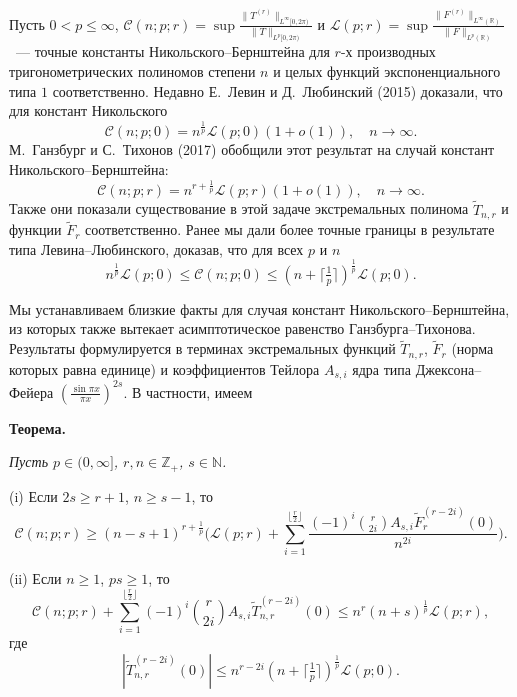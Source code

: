 \vzmscaption

Пусть $0<p\le \infty$, $\mathcal{C}(n;p;r)=\sup
\frac{\|T^{(r)}\|_{L^{\infty}[0,2\pi)}}{\|T\|_{L^{p}[0,2\pi)}}$ и
$\mathcal{L}(p;r)=\sup
\frac{\|F^{(r)}\|_{L^{\infty}(\mathbb{R})}}{\|F\|_{L^{p}(\mathbb{R})}}$~---
точные константы Никольского--Бернштейна для $r$-х производных
тригонометрических полиномов степени $n$ и целых функций экспоненциального типа
$1$ соответственно. Недавно Е.~Левин и Д.~Любинский (2015) доказали, что для
констант Никольского
\[
\mathcal{C}(n;p;0)=n^{\frac{1}{p}}\mathcal{L}(p;0)(1+o(1)),\quad n\to \infty.
\]
М.~Ганзбург и С.~Тихонов (2017) обобщили этот результат на случай констант
Никольского--Бернштейна:
\[
\mathcal{C}(n;p;r)=n^{r+\frac{1}{p}}\mathcal{L}(p;r)(1+o(1)),\quad n\to \infty.
\]
Также они показали существование в этой задаче экстремальных полинома
$\tilde{T}_{n,r}$ и функции $\tilde{F}_{r}$ соответственно. Ранее мы дали более
точные границы в результате типа Левина--Любинского, доказав, что для всех $p$
и $n$
\[
n^{\frac{1}{p}}\mathcal{L}(p;0)\le \mathcal{C}(n;p;0)\le (n+\lceil
\tfrac{1}{p}\rceil)^{\frac{1}{p}}\mathcal{L}(p;0).
\]

Мы устанавливаем близкие факты для случая констант Никольского--Бернштейна, из
которых также вытекает асимптотическое равенство Ганзбурга--Тихонова.
Результаты формулируется в терминах экстремальных функций $\tilde{T}_{n,r}$,
$\tilde{F}_{r}$ (норма которых равна единице) и коэффициентов Тейлора $A_{s,i}$
ядра типа Джексона--Фейера $(\frac{\sin \pi x}{\pi x})^{2s}$. В частности,
имеем

\textbf{Теорема.} {\it Пусть $p\in (0,\infty]$, $r,n\in \mathbb{Z}_{+}$, $s\in
\mathbb{N}$.

\textup{(i)} Если $2s\ge r+1$, $n\ge s-1$, то
\[
\mathcal{C}(n;p;r)\ge (n-s+1)^{r+\frac{1}{p}}\biggl(\mathcal{L}(p;r)+
\sum_{i=1}^{\lfloor
\frac{r}{2}\rfloor}\frac{(-1)^{i}\binom{r}{2i}A_{s,i}\tilde{F}_{r}^{(r-2i)}(0)}{n^{2i}}\biggr).
\]

\textup{(ii)} Если $n\ge 1$, $ps\ge 1$, то
\[
\mathcal{C}(n;p;r)+\sum_{i=1}^{\lfloor \frac{r}{2}\rfloor}(-1)^{i}\binom{r}{2i}A_{s,i}
\tilde{T}_{n,r}^{(r-2i)}(0)\le n^{r}(n+s)^{\frac{1}{p}}\mathcal{L}(p;r),
\]
где
\[
|\tilde{T}_{n,r}^{(r-2i)}(0)|\le n^{r-2i}(n+\lceil
\tfrac{1}{p}\rceil)^{\frac{1}{p}}\mathcal{L}(p;0).
\]
} 